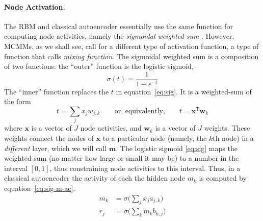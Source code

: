 \paragraph{Node Activation.} The RBM and classical autoencoder essentially use the same function for computing node activities, namely the \emph{sigmoidal weighted sum} \citep{hinton:1987trans, hinton-and-salak:2006}.
However, MCMMs, as we shall see, call for a different type of activation function, a type of function that \citet{saund:94} calls \emph{mixing function}.
The sigmoidal weighted sum is a composition of two functions: the ``outer'' function is the logistic sigmoid, 
	\begin{equation} %
	\label{eq:sig}
	\sigma(t) = \frac{1}{1 + e^{-t}} 
	\end{equation} %
The ``inner'' function replaces the $t$ in equation~\eqref{eq:sig}. It is a weighted-sum of the form 
\begin{equation} \label{eq:wtd-sum}
t = \sum_{j} x_{j} w_{j,k} \qquad  \text{or, equivalently,} \qquad t = \textbf{x}^{\textsf{T}}\textbf{w}_k
\end{equation}
where $\textbf{x}$ is a vector of $J$ node activities, and $\textbf{w}_k$ is a vector of $J$ weights. These weights connect the nodes of $\textbf{x}$ to a particular node (namely, the $k$th node) in a \emph{different} layer, which we will call $\textbf{m}$. 
The logistic sigmoid \eqref{eq:sig} maps the weighted sum (no matter how large or small it may be) to a number in the interval $[0,1]$, thus constraining node activities to this interval.
Thus, in a classical autoencoder the activity of each the hidden node $m_k$ is computed by equation~\eqref{eq:sig-m-ac}. 
\begin{align}
\label{eq:sig-m-ac}
m_{k} &= \sigma\big(\sum_{j} x_{j} a_{j,k}\big) \\
\label{eq:sig-r-ac}
r_{j} &= \sigma\big(\sum_{k}  m_{k} b_{k,j} \big)
\end{align}
